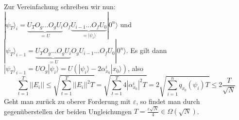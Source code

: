 \documentclass[a4paper, 12pt]{article}
\theoremstyle{plain}
\theoremstyle{definition}
\theoremstyle{lemma}
\theoremstyle{remark}
\theoremstyle{example}
\begin{document}
	Zur Vereinfachung schreiben wir nun:\\
	$|\psi_T\rangle_i = \underbrace{U_TO_g ... O_gU_i}_{= U} O_f\underbrace{U_{i-1} ... O_fU_0}_{=|\psi_i\rangle}|0^n\rangle$ und \\
	$|\psi_T\rangle_{i-1} = \underbrace{U_TO_g ... O_gU_i}_{= U} O_gU_{i-1} ... O_fU_0|0^n\rangle$. Es gilt dann $|\psi_T\rangle_{i-1} = UO_g|\psi_i\rangle = U(|\psi_i\rangle - 2\alpha_{x_0}^i |x_0\rangle)$, also \[\sum_{t=1}^T ||E_i|| \leq \sqrt{\sum_{t=1}^T ||E_i||^2 T} = \sqrt{\sum_{t=1}^T 4|\alpha_{x_0}^i|^2 T} = 2\sqrt{\sum_{i=1}^n q_{x_0}(\psi_i) T} \leq 2\frac{T}{\sqrt{N}}\]
	Geht man zurück zu oberer Forderung mit $\varepsilon$, so findet man durch gegenüberstellen der beiden Ungleichungen $T = \frac{\varepsilon\sqrt{N}}{4} \in \Omega(\sqrt{N})$.
\end{document}
